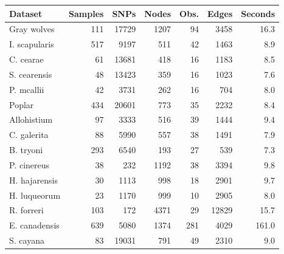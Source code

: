 \begin{tabular}{lrrrrrr}
\toprule
Dataset & Samples & SNPs & Nodes & Obs. & Edges & Seconds \\
\midrule
Gray wolves & 111 & 17729 & 1207 & 94 & 3458 & 16.3 \\
I. scapularis & 517 & 9197 & 511 & 42 & 1463 & 8.9 \\
C. cearae & 61 & 13681 & 418 & 16 & 1183 & 8.5 \\
S. cearensis & 48 & 13423 & 359 & 16 & 1023 & 7.6 \\
P. mcallii & 42 & 3731 & 262 & 16 & 704 & 8.0 \\
Poplar & 434 & 20601 & 773 & 35 & 2232 & 8.4 \\
Allohistium & 97 & 3333 & 516 & 39 & 1444 & 9.4 \\
C. galerita & 88 & 5990 & 557 & 38 & 1491 & 7.9 \\
B. tryoni & 293 & 6540 & 193 & 27 & 539 & 7.3 \\
P. cinereus & 38 & 232 & 1192 & 38 & 3394 & 9.8 \\
H. hajarensis & 30 & 1113 & 998 & 18 & 2901 & 9.7 \\
H. luqueorum & 23 & 1170 & 999 & 10 & 2905 & 8.0 \\
R. forreri & 103 & 172 & 4371 & 29 & 12829 & 15.7 \\
E. canadensis & 639 & 5080 & 1374 & 281 & 4029 & 161.0 \\
S. cayana & 83 & 19031 & 791 & 49 & 2310 & 9.0 \\
\bottomrule
\end{tabular}
